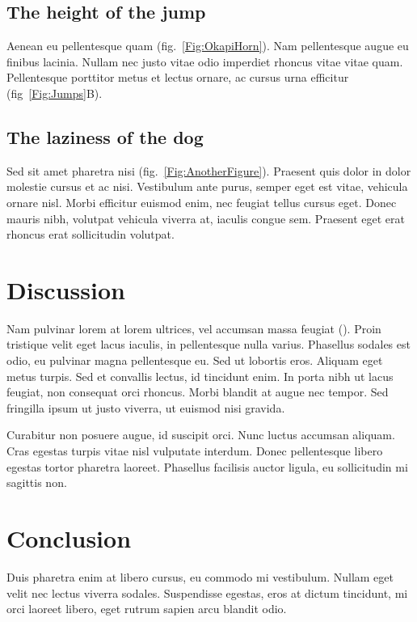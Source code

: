 \documentclass[11pt]{article}
\begin{document}
\subsection*{The height of the jump}

Aenean eu pellentesque quam (fig.~\ref{Fig:OkapiHorn}). Nam pellentesque 
augue eu finibus lacinia. Nullam nec justo vitae odio imperdiet rhoncus 
vitae vitae quam. Pellentesque porttitor metus et lectus ornare, ac 
cursus urna efficitur (fig~\ref{Fig:Jumps}B). 

\subsection*{The laziness of the dog}

Sed sit amet pharetra nisi (fig.~\ref{Fig:AnotherFigure}). Praesent 
quis dolor in dolor molestie cursus et ac nisi. Vestibulum ante purus, 
semper eget est vitae, vehicula ornare nisl. Morbi efficitur euismod 
enim, nec feugiat tellus cursus eget. Donec mauris nibh, volutpat 
vehicula viverra at, iaculis congue sem. Praesent eget erat rhoncus erat 
sollicitudin volutpat. 

\section*{Discussion}

Nam pulvinar lorem at lorem ultrices, vel accumsan massa feugiat 
(\citealt{Ing11}). Proin tristique velit eget lacus iaculis, in 
pellentesque nulla varius. Phasellus sodales est odio, eu pulvinar 
magna pellentesque eu. Sed ut lobortis eros. Aliquam eget metus turpis. 
Sed et convallis lectus, id tincidunt enim. In porta nibh ut lacus 
feugiat, non consequat orci rhoncus. Morbi blandit at augue nec tempor. 
Sed fringilla ipsum ut justo viverra, ut euismod nisi gravida.

Curabitur non posuere augue, id suscipit orci. Nunc luctus accumsan 
aliquam. Cras egestas turpis vitae nisl vulputate interdum. Donec 
pellentesque libero egestas tortor pharetra laoreet. Phasellus facilisis 
auctor ligula, eu sollicitudin mi sagittis non.

\section*{Conclusion}

Duis pharetra enim at libero cursus, eu commodo mi vestibulum. Nullam 
eget velit nec lectus viverra sodales. Suspendisse egestas, eros at 
dictum tincidunt, mi orci laoreet libero, eget rutrum sapien arcu 
blandit odio.
\end{document}
